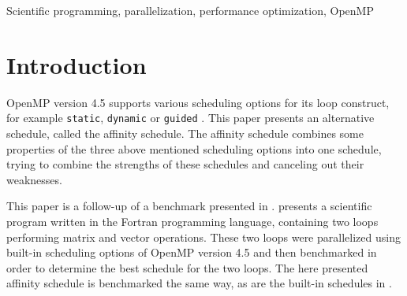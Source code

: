\documentclass[twoside,11pt]{article}
\title{\titl}
\author{}
\begin{document}
\maketitle

\begin{abstract}
This paper describes an alternative schedule for scheduling
OpenMP's loop construct, the affinity schedule.
The affinity schedule tries to add positive properties of
different built-in schedules together into one schedule.
This paper is a follow-up on a benchmark presented in
\citet{b1}.

Two versions of the affinity schedule are presented and
compared against each other.
This paper describes in detail how the two versions of the
affinity schedule are implemented.
Afterwards they are benchmarked and compared against well
performing built-in schedules determined in \citet{b1}.

While the two versions of the affinity schedule perform
well for the most parts and sometimes even outperform
the built-in schedules, this paper comes to the conclusion
that the affinity schedule is simply too complex and
contains too much synchronization, which hurts its
scalability.
An idea for a better performing affinity schedule is
presented.
\end{abstract}

\begin{keywords}
Scientific programming, parallelization,
performance optimization, OpenMP
\end{keywords}

\section{Introduction} %

OpenMP version 4.5 supports various scheduling options for
its loop construct, for example \texttt{static},
\texttt{dynamic} or \texttt{guided}
\citep[see][Chapter 2]{omp}.
This paper presents an alternative schedule, called the
affinity schedule.
The affinity schedule combines some properties of the three
above mentioned scheduling options into one schedule,
trying to combine the strengths of these schedules and
canceling out their weaknesses.

This paper is a follow-up of a benchmark presented in
\citet{b1}.
\citet{b1} presents a scientific program written in the
Fortran programming language, containing two loops
performing matrix and vector operations.
These two loops were parallelized using built-in scheduling
options of OpenMP version 4.5 and then benchmarked in order
to determine the best schedule for the two loops.
The here presented affinity schedule is benchmarked the
same way, as are the built-in schedules in \citet{b1}.
\end{document}
